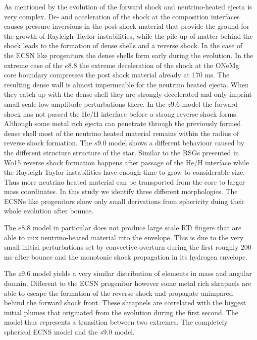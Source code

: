 \documentclass[fleqn,usenatbib]{mnras}
\begin{document}
As mentioned by \citet{Wongwathanarat2015} the evolution of the forward shock and neutrino-heated ejecta is very complex. De- and acceleration of the shock at the composition interfaces causes pressure inversions in the post-shock material that provide the ground for the growth of Rayleigh-Taylor instabilities, while the pile-up of matter behind the shock leads to the formation of dense shells and a reverse shock. 
In the case of the ECSN like progenitors the dense shells form early during the evolution. In the extreme case of the $e8.8$ the extreme deceleration of the shock at the ONeMg core boundary compresses the post shock material already at 170 ms. The resulting dense wall is almost impermeable for the neutrino heated ejecta. When they catch up with the dense shell they are strongly decelerated and only imprint small scale low amplitude perturbations there. 
In the $z9.6$ model the forward shock has not passed the He/H interface before a strong reverse shock forms. Although some metal rich ejecta can penetrate through the previously formed dense shell most of the neutrino heated material remains within the radius of reverse shock formation.
The $s9.0$ model shows a different behaviour caused by the different structure structure of the star. Similar to the RSGs presented in Wo15 reverse shock formation happens after passage of the He/H interface while the Rayleigh-Taylor instabilities have enough time to grow to considerable size. Thus more neutrino heated material can be transported from the core to larger mass coordinates. 
In this study we identify three different morphologies.
The ECSNe like progenitors show only small derivations from sphericity duing their whole evolution after bounce.

The $e8.8$ model in particular does not produce large scale RTi fingers that are able to mix neutrino-heated material into the envelope. This is due to the very small initial perturbations set by convective overturn during the first roughly 200 ms after bounce and the monotonic shock propagation in its hydrogen envelope. 

The $z9.6$ model yields a very similar distribution of elements in mass and angular domain. Different to the ECSN progenitor however some metal rich shrapnels are able to escape the formation of the reverse shock and propagate unimpared behind the forward shock front. These shrapnels are correlated with the biggest initial plumes that originated from the evolution during the first second. The model thus represents a transition between two extremes. The completely spherical ECNS model and the $s9.0$ model.
\end{document}
